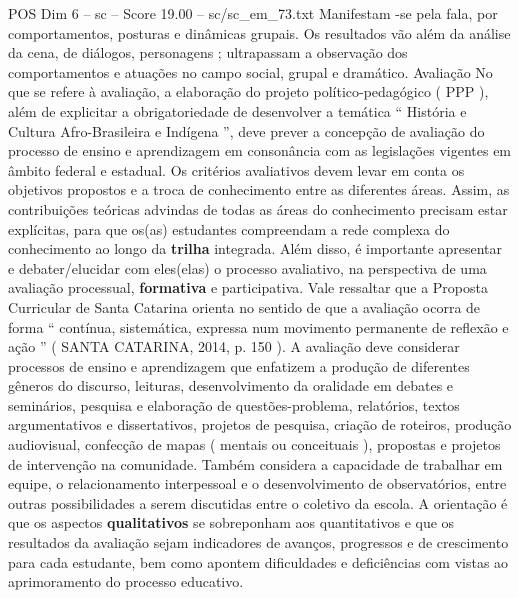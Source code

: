\begin{textsample}{POS Dim 6 – sc – Score 19.00 – sc/sc\_em\_73.txt}
Manifestam -se pela fala, por comportamentos, posturas e dinâmicas grupais.
Os resultados vão além da análise da cena, de diálogos, personagens ; ultrapassam a observação dos comportamentos e atuações no campo social, grupal e dramático.
Avaliação No que se refere à avaliação, a elaboração do projeto político-pedagógico ( PPP ), além de explicitar a obrigatoriedade de desenvolver a temática “ História e Cultura Afro-Brasileira e Indígena ”, deve prever a concepção de avaliação do processo de ensino e aprendizagem em consonância com as legislações vigentes em âmbito federal e estadual.
Os critérios avaliativos devem levar em conta os objetivos propostos e a troca de conhecimento entre as diferentes áreas.
Assim, as contribuições teóricas advindas de todas as áreas do conhecimento precisam estar explícitas, para que os(as) estudantes compreendam a rede complexa do conhecimento ao longo da \textbf{trilha} integrada.
Além disso, é importante apresentar e debater/elucidar com eles(elas) o processo avaliativo, na perspectiva de uma avaliação processual, \textbf{formativa} e participativa.
Vale ressaltar que a Proposta Curricular de Santa Catarina orienta no sentido de que a avaliação ocorra de forma “ contínua, sistemática, expressa num movimento permanente de reflexão e ação ” ( SANTA CATARINA, 2014, p. 150 ).
A avaliação deve considerar processos de ensino e aprendizagem que enfatizem a produção de diferentes gêneros do discurso, leituras, desenvolvimento da oralidade em debates e seminários, pesquisa e elaboração de questões-problema, relatórios, textos argumentativos e dissertativos, projetos de pesquisa, criação de roteiros, produção audiovisual, confecção de mapas ( mentais ou conceituais ), propostas e projetos de intervenção na comunidade.
Também considera a capacidade de trabalhar em equipe, o relacionamento interpessoal e o desenvolvimento de observatórios, entre outras possibilidades a serem discutidas entre o coletivo da escola.
A orientação é que os aspectos \textbf{qualitativos} se sobreponham aos quantitativos e que os resultados da avaliação sejam indicadores de avanços, progressos e de crescimento para cada estudante, bem como apontem dificuldades e deficiências com vistas ao aprimoramento do processo educativo.

\end{textsample}
